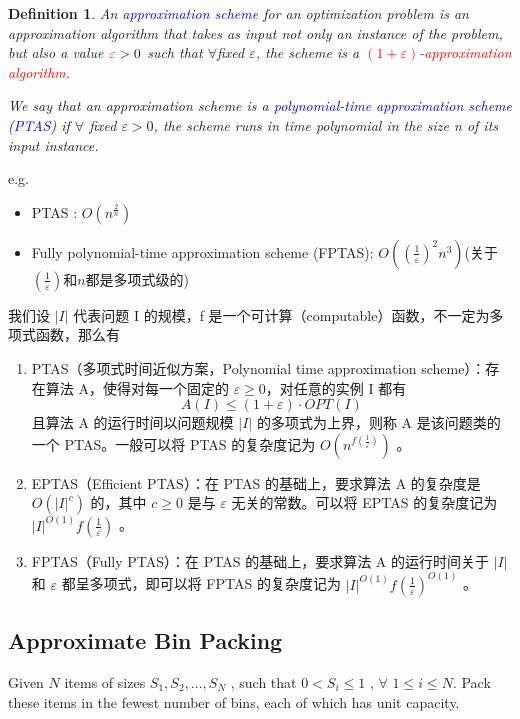 \documentclass{article}
\newtheorem*{Definition}{Definition}
\begin{document}
\par\hspace*{\fill}\par

\begin{Definition}
    An \textcolor{blue}{approximation scheme} for an optimization problem is an approximation algorithm that takes as input not only an instance of the problem, but also a value $\textcolor{red}{\varepsilon} > 0$ such that $\forall$fixed $\varepsilon$, the scheme is a \textcolor{red}{$(1+ \varepsilon)$-approximation algorithm}.
    
    We say that an approximation scheme is a \textcolor{blue}{polynomial-time approximation scheme (PTAS)} if $\forall$ fixed $\varepsilon > 0$, the scheme runs in time polynomial in the size n of its input instance.
\end{Definition}

e.g. 
\begin{itemize}\small
    \item PTAS : $O(n^{\frac{2}{n}})$
    \item Fully polynomial-time approximation scheme (FPTAS): $O((\frac{1}{\varepsilon})^2n^3)$(关于$(\frac{1}{\varepsilon})$和$n$都是多项式级的)
\end{itemize}

我们设 $|I|$ 代表问题 I 的规模，f 是一个可计算（computable）函数，不一定为多项式函数，那么有

\begin{enumerate}
    \item PTAS（多项式时间近似方案，Polynomial time approximation scheme）：存在算法 A，使得对每一个固定的 $\varepsilon \ge 0$，对任意的实例 I 都有
    $$A(I) \le (1+\varepsilon) \cdot OPT(I)$$
    且算法 A 的运行时间以问题规模 $|I|$ 的多项式为上界，则称 A 是该问题类的一个 PTAS。一般可以将 PTAS 的复杂度记为 $O(n^{f(\frac{1}{\varepsilon})})$ 。
    \item EPTAS（Efficient PTAS）：在 PTAS 的基础上，要求算法 A 的复杂度是 $O(|I|^c)$ 的，其中 $c \ge 0$ 是与 $\varepsilon$ 无关的常数。可以将 EPTAS 的复杂度记为 $|I|^{O(1)}f(\frac{1}{ε})$ 。
    \item FPTAS（Fully PTAS）：在 PTAS 的基础上，要求算法 A 的运行时间关于 $|I|$ 和 $\varepsilon$ 都呈多项式，即可以将 FPTAS 的复杂度记为 $|I|^{O(1)}f(\frac{1}{ε})^{O(1)}$ 。
\end{enumerate}

\subsection{Approximate Bin Packing}
Given $N$ items of sizes  $S_1 , S_2 , \dots, S_N$ , such that $0 < S_i \le 1$ , $\forall$  $1 \le i \le N$.  Pack these items in the fewest number of bins, each of which has unit capacity.
\end{document}
